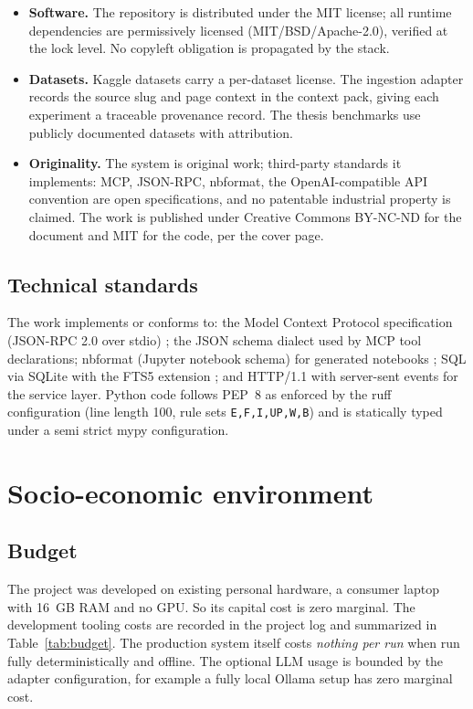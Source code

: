 \begin{itemize}
	\item \textbf{Software.} The repository is distributed under the MIT license; all runtime dependencies are permissively licensed (MIT/BSD/Apache-2.0), verified at the lock level. No copyleft obligation is propagated by the stack.
	\item \textbf{Datasets.} Kaggle datasets carry a per-dataset license. The ingestion adapter records the source slug and page context in the context pack, giving each experiment a traceable provenance record. The thesis benchmarks use publicly documented datasets with attribution.
	\item \textbf{Originality.} The system is original work; third-party standards it implements: MCP, JSON-RPC, nbformat, the OpenAI-compatible API convention are open specifications, and no patentable industrial property is claimed. The work is published under Creative Commons BY-NC-ND for the document and MIT for the code, per the cover page.
\end{itemize}

\subsection{Technical standards}

The work implements or conforms to: the Model Context Protocol specification (JSON-RPC 2.0 over stdio) \cite{mcp2024spec}; the JSON schema dialect used by MCP tool declarations; nbformat (Jupyter notebook schema) for generated notebooks \cite{nbformat2024}; SQL via SQLite with the FTS5 extension \cite{sqlite2024fts5}; and HTTP/1.1 with server-sent events for the service layer. Python code follows PEP~8 as enforced by the ruff configuration (line length 100, rule sets \texttt{E,F,I,UP,W,B}) and is statically typed under a semi strict mypy configuration.

\section{Socio-economic environment}
\label{sec:socioeconomic}

\subsection{Budget}

The project was developed on existing personal hardware, a consumer laptop with 16~GB RAM and no GPU. So its capital cost is zero marginal. The development tooling costs are recorded in the project log and summarized in Table~\ref{tab:budget}. The production system itself costs \emph{nothing per run} when run fully deterministically and offline. The optional LLM usage is bounded by the adapter configuration, for example a fully local Ollama setup has zero marginal cost.

